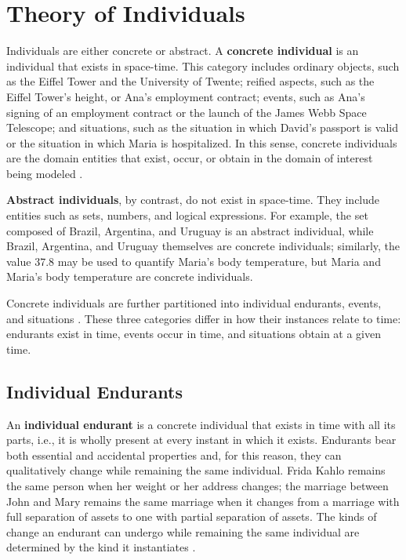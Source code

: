 \section{Theory of Individuals}

Individuals are either concrete or abstract. A \textbf{concrete individual} is an individual that exists in space-time. This category includes ordinary objects, such as the Eiffel Tower and the University of Twente; reified aspects, such as the Eiffel Tower's height, or Ana's employment contract; events, such as Ana's signing of an employment contract or the launch of the James Webb Space Telescope; and situations, such as the situation in which David's passport is valid or the situation in which Maria is hospitalized. In this sense, concrete individuals are the domain entities that exist, occur, or obtain in the domain of interest being modeled \cite{ontological_foundations_for_structural_conceptual_models_2005}.

\textbf{Abstract individuals}, by contrast, do not exist in space-time. They include entities such as sets, numbers, and logical expressions. For example, the set composed of Brazil, Argentina, and Uruguay is an abstract individual, while Brazil, Argentina, and Uruguay themselves are concrete individuals; similarly, the value 37.8 may be used to quantify Maria's body temperature, but Maria and Maria's body temperature are concrete individuals.

Concrete individuals are further partitioned into individual endurants, events, and situations \cite{ufo_unified_foundational_ontology_2021,representing_a_reference_foundational_ontology_of_events_in_sroiq_2019}. These three categories differ in how their instances relate to time: endurants exist in time, events occur in time, and situations obtain at a given time.

\subsection{Individual Endurants}

An \textbf{individual endurant} is a concrete individual that exists in time with all its parts, i.e., it is wholly present at every instant in which it exists. Endurants bear both essential and accidental properties and, for this reason, they can qualitatively change while remaining the same individual. Frida Kahlo remains the same person when her weight or her address changes; the marriage between John and Mary remains the same marriage when it changes from a marriage with full separation of assets to one with partial separation of assets. The kinds of change an endurant can undergo while remaining the same individual are determined by the kind it instantiates \cite{ufo_unified_foundational_ontology_2021}.

